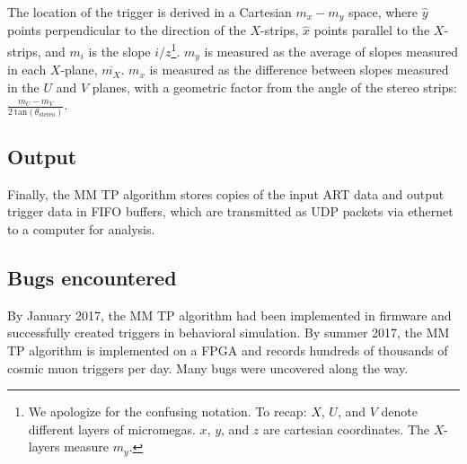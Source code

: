 The location of the trigger is derived in a Cartesian $m_x-m_y$ space, where $\hat{y}$ points perpendicular to the direction of the $X$-strips, $\hat{x}$ points parallel to the $X$-strips, and $m_i$ is the slope $i/z$\footnote{We apologize for the confusing notation. To recap: $X$, $U$, and $V$ denote different layers of micromegas. $x$, $y$, and $z$ are cartesian coordinates. The $X$-layers measure $m_y$.}. $m_y$ is measured as the average of slopes measured in each $X$-plane, $\overline{m_X}$. $m_x$ is measured as the difference between slopes measured in the $U$ and $V$ planes, with a geometric factor from the angle of the stereo strips: $\frac{m_U - m_V}{2\ \text{tan}(\theta_\text{stereo})}$.

\subsection{Output}
\label{sec:alg-output}

Finally, the MM TP algorithm stores copies of the input ART data and output trigger data in FIFO buffers, which are transmitted as UDP packets via ethernet to a computer for analysis.

\subsection{Bugs encountered}
\label{sec:alg-bugs}

By January 2017, the MM TP algorithm had been implemented in firmware and successfully created triggers in behavioral simulation. By summer 2017, the MM TP algorithm is implemented on a FPGA and records hundreds of thousands of cosmic muon triggers per day. Many bugs were uncovered along the way.


